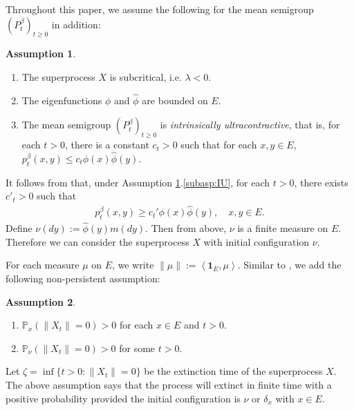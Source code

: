 \documentclass[12pt,a4paper]{amsart}
\numberwithin{equation}{section}
\theoremstyle{plain}
\theoremstyle{definition}
\newtheorem{asp}{Assumption}
\begin{document}
Throughout this paper, we assume the following for the mean semigroup $(P_t^\beta)_{t\geq 0}$ in addition:
\begin{asp}~
\label{asp:IU}
\begin{enumerate}
\item The superprocess $X$ is subcritical, i.e. $\lambda < 0$.
\item The eigenfunctions $\phi$ and $\widehat\phi$ are bounded on $E$.
\item \label{subasp:IU} 
  The mean semigroup $(P_t^\beta)_{t\geq 0}$ is \emph{intrinsically ultracontractive}, that is, for each $t>0$, there is a constant $c_t >0$ such that for each $x,y\in E$, $p^\beta_t(x,y) \leq c_t \phi(x) \widehat\phi(y)$.
\end{enumerate}
\end{asp}
\par
It follows from \cite[Proposition 2.5]{KimSong2008Intrinsic} that, under Assumption \ref{asp:IU}.\eqref{subasp:IU}, for each $t>0$, there exists $c'_t > 0$ such that 
\begin{align}
	p^\beta_t (x,y) 
  \geq c_t' \phi(x) \widehat \phi(y),
  \quad x,y \in E.
\end{align}
Define $\nu(dy):= \widehat \phi(y) m(dy)$. 
Then from above, $\nu$ is a finite measure on $E$.
Therefore we can consider the superprocess $X$ with initial configuration $\nu$.
  
For each measure $\mu$ on $E$, we write $\|\mu\|:= \left\langle \mathbf 1_E,\mu \right\rangle$.
Similar to \cite{RenSongSun2019Spine,RenSongZhang2018Williams}, we add the following non-persistent assumption:
\begin{asp}~ 
  \label{asp:3}
  \begin{enumerate}
  \item \label{subsup:point_non_presistence}
    $\mathbb P_{x}(\|X_t\| = 0)>0$ for each $x\in E$ and $t>0$.
  \item \label{subasp:measure_non_presistence}
    $\mathbb P_{\nu}(\|X_t\| = 0)>0$ for some $t>0$.
  \end{enumerate}
\end{asp}
 Let $\zeta=\inf\{t>0: \|X_t\| = 0\}$ be the extinction time of the superprocess $X$.
 The above assumption says that the process will extinct in finite time with a positive probability provided the initial configuration is $\nu$ or $\delta_x$ with $x\in E$.
\end{document}
